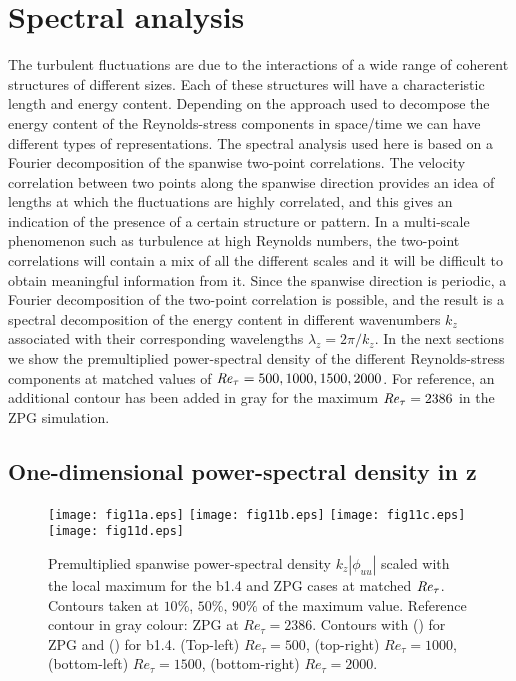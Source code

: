 
\section{Spectral analysis} \label{sec:Spectra}

The turbulent fluctuations are due to the interactions of a wide range of coherent structures of different sizes. Each of these structures will have a characteristic length and energy content. Depending on the approach used to decompose the energy content of the Reynolds-stress components in space/time we can have different types of representations.
The spectral analysis used here is based on a Fourier decomposition of the spanwise two-point correlations. The velocity correlation between two points along the spanwise direction provides an idea of lengths at which the fluctuations are highly correlated, and this gives an indication of the presence of a certain structure or pattern. In a multi-scale phenomenon such as turbulence at high Reynolds numbers, the two-point correlations will contain a mix of all the different scales and it will be difficult to obtain meaningful information from it. 
Since the spanwise direction is periodic, a Fourier decomposition of the two-point correlation is possible, and the result is a spectral decomposition of the energy content in different wavenumbers $k_z$ associated with their corresponding wavelengths $\lambda_z=2\pi/k_z$. 
In the next sections we show the premultiplied power-spectral density of the different Reynolds-stress components at matched values of $\mbox{\textit{Re}}_{\tau}=500, 1000,1500,2000$. For reference, an additional contour has been added in gray for the maximum $\mbox{\textit{Re}}_{\tau}=2386$ in the ZPG simulation.

\subsection{One-dimensional power-spectral density in z}

\begin{figure}
\texttt{[image: fig11a.eps]}
\texttt{[image: fig11b.eps]}
\texttt{[image: fig11c.eps]}
\texttt{[image: fig11d.eps]}
  \caption{Premultiplied spanwise power-spectral density $k_z |\phi_{uu}|$ scaled with the local maximum for the b1.4 and ZPG cases at matched $\mbox{\textit{Re}}_{\tau}$. Contours taken at $10\%$, $50\%$, $90\%$ of the maximum value. Reference contour in gray colour: ZPG at $Re_{\tau}=2386$. Contours with (\protect\blackline) for ZPG and (\protect\orangeline) for b1.4. (Top-left) $Re_{\tau}=500$, (top-right) $Re_{\tau}=1000$, (bottom-left) $Re_{\tau}=1500$, (bottom-right) $Re_{\tau}=2000$.}
\label{fig:spec1DUU}
\end{figure}

